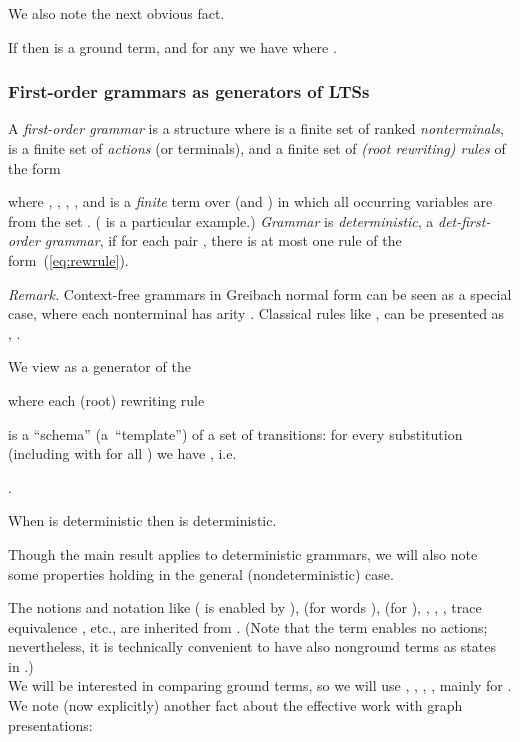 \documentclass[12pt]{article}
\begin{document}
We also note the next obvious fact.

\begin{observ}\label{prop:limdprefform}
If  then  is a ground term, and for
any  we
have  where 
.
\end{observ}








\subsubsection*{First-order grammars as generators
of LTSs}

\begin{defn}
A \emph{first-order grammar} is a structure 
 where  is a finite set of 
ranked \emph{nonterminals}, 
 is a finite set of \emph{actions} (or terminals), 
and  
a finite set of \emph{(root rewriting) rules} of the form

where , , 
,
,
and  is a
\emph{finite}  term over  (and ) 
 in which all occurring
variables are from the set
.
( is a particular example.)
\emph{Grammar}  is \emph{deterministic}, a \emph{det-first-order
grammar},
if for each pair ,  
there is at most one rule of the form~(\ref{eq:rewrule}). 
\end{defn}

\smallskip

\noindent
\emph{Remark.}
Context-free grammars  in Greibach normal form
can be seen as  a special case,
where each nonterminal has arity .
Classical rules like ,  can be presented as 
,
.

\begin{center}
We view 
as a generator of the 

\end{center}
where each (root) rewriting rule

is a ``schema''
(a~``template'') of a set of transitions:
for every substitution 
(including  with  for all )
we have 
, 
i.e.
\begin{center}
.
\end{center}
\begin{observ}
When  is deterministic then   is deterministic.
\end{observ}
Though the main result applies to deterministic grammars, we will also 
note some properties holding in the general (nondeterministic) case.

The notions and notation like  ( is enabled by ),
 (for words ), 
 (for ),
, , ,
trace equivalence , etc.,
are inherited from . 
(Note that the term  enables no actions; nevertheless,
it is technically convenient to have also
nonground terms as states in  .)
\\
We will be interested in comparing ground terms,
so we will use , , 
, , 
mainly for
.
We note (now explicitly)
another fact about the effective work with graph presentations:
\end{document}
